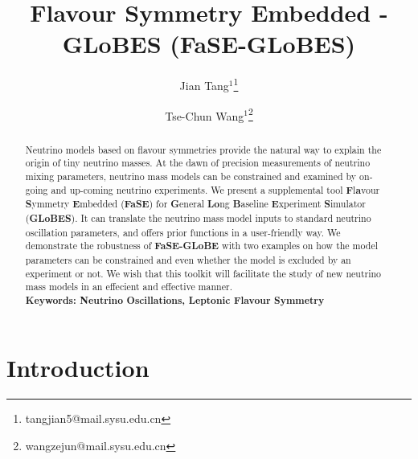\documentclass[aps,prd,nofootinbib,preprint]{revtex4}
\begin{document}
 
\title{Flavour Symmetry Embedded - GLoBES (FaSE-GLoBES)} %
\author{Jian Tang$^1$\footnote{tangjian5@mail.sysu.edu.cn}}
\author{Tse-Chun Wang$^1$\footnote{wangzejun@mail.sysu.edu.cn}}

\begin{abstract}
Neutrino models based on flavour symmetries provide the natural way to explain the origin of tiny neutrino masses. At the dawn of precision measurements of neutrino mixing parameters, neutrino mass models can be constrained and examined by on-going and up-coming neutrino experiments. We present a supplemental tool \textbf{F}l\textbf{a}vour \textbf{S}ymmetry \textbf{E}mbedded (\textbf{FaSE}) for \textbf{G}eneral \textbf{Lo}ng \textbf{B}aseline \textbf{E}xperiment \textbf{S}imulator (\textbf{GLoBES}). It can translate the neutrino mass model inputs to standard neutrino oscillation parameters, and offers prior functions in a user-friendly way. We demonstrate the robustness of \textbf{FaSE-GLoBE} with two examples on how the model parameters can be constrained and even whether the model is excluded by an experiment or not. We wish that this toolkit will facilitate the study of new neutrino mass models in an effecient and effective manner.\\
\textbf{Keywords: Neutrino Oscillations, Leptonic Flavour Symmetry}  
\end{abstract} 

\maketitle

\section{Introduction}\label{sec:intro}
\end{document}

